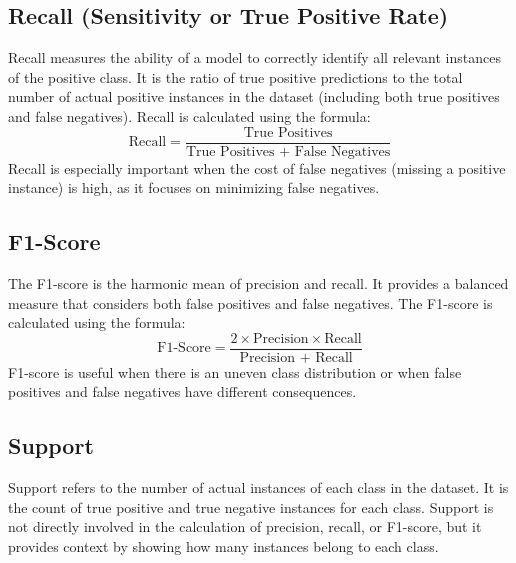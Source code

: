 \documentclass{article}
\begin{document}
\subsection{Recall (Sensitivity or True Positive Rate)}
Recall measures the ability of a model to correctly identify all relevant instances of the positive class. It is the ratio of true positive predictions to the total number of actual positive instances in the dataset (including both true positives and false negatives). Recall is calculated using the formula:
\[
  \text{Recall} = \frac{\text{True Positives}}{\text{True Positives + False Negatives}}
\]
Recall is especially important when the cost of false negatives (missing a positive instance) is high, as it focuses on minimizing false negatives.

\subsection{F1-Score}
The F1-score is the harmonic mean of precision and recall. It provides a balanced measure that considers both false positives and false negatives. The F1-score is calculated using the formula:
\[
  \text{F1-Score} = \frac{2 \times \text{Precision} \times \text{Recall}}{\text{Precision + Recall}}
\]
F1-score is useful when there is an uneven class distribution or when false positives and false negatives have different consequences.

\subsection{Support}
Support refers to the number of actual instances of each class in the dataset. It is the count of true positive and true negative instances for each class. Support is not directly involved in the calculation of precision, recall, or F1-score, but it provides context by showing how many instances belong to each class.
\end{document}
